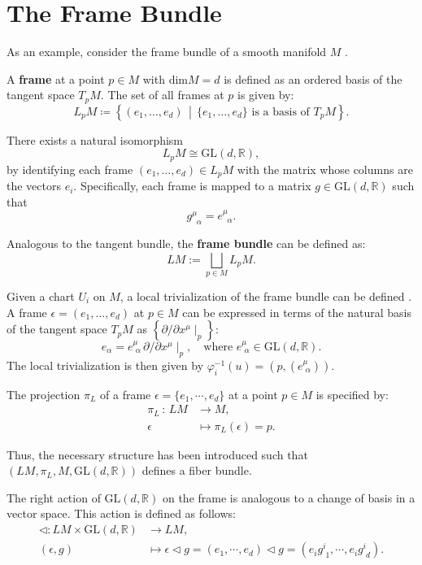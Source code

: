 \section{The Frame Bundle}

As an example, consider the frame bundle of a smooth manifold \( M \) \cite{NakaharaGeometrytopologyphysics2005}.

A \textbf{frame} at a point \( p \in M \) with \(\text{dim} M = d\) is defined as an ordered basis of the tangent space \(T_pM\). The set of all frames at \( p \) is given by:
\[
L_pM \coloneqq \left\{ (e_1, \dots, e_d) \,\middle|\, \{e_1, \dots, e_d\} \text{ is a basis of } T_pM \right\}.
\]

There exists a natural isomorphism
\[
L_pM \cong \mathrm{GL}(d, \mathbb{R}),
\]
by identifying each frame \( (e_1, \dots, e_d) \in L_pM \) with the matrix whose columns are the vectors \( e_i \). Specifically, each frame is mapped to a matrix \( g \in \mathrm{GL}(d, \mathbb{R}) \) such that
\[
g^\mu_{\;\;\alpha} = e^\mu_{\;\;\alpha}.
\]

Analogous to the tangent bundle, the \textbf{frame bundle} can be defined as:
\[ LM := \bigsqcup_{p \in M} L_pM. \]

Given a chart \( U_i \) on \( M \), a local trivialization of the frame bundle can be defined \cite{NakaharaGeometrytopologyphysics2005}. A frame \( \epsilon = (e_1, \dots, e_d) \) at \( p \in M \) can be expressed in terms of the natural basis of the tangent space \( T_pM \) as \( \left\{ \partial / \partial x^\mu \mid_p \right\} \):
\[ e_\alpha = e^\mu_{\,\,\alpha} \, \partial/\partial x^\mu \mid_p, \quad \text{where } e^\mu_{\,\,\alpha} \in \mathrm{GL}(d, \mathbb{R}). \]
The local trivialization is then given by \( \varphi_i^{-1}(u)=(p,(e^\mu_{\,\,\alpha})) \).

The projection \( \pi_L \) of a frame \( \epsilon = \{e_1, \cdots, e_d\} \) at a point \( p \in M \) is specified by:
\begin{align*}
  \pi_L \, : \, LM & \longrightarrow M, \\
        \epsilon & \mapsto \pi_L(\epsilon)=p.
\end{align*}

Thus, the necessary structure has been introduced such that \( (LM, \pi_L, M, \text{GL}(d,\mathbb{R})) \) defines a fiber bundle.

The right action of \( \mathrm{GL}(d,\mathbb{R}) \) on the frame is analogous to a change of basis in a vector space. This action is defined as follows:
\begin{align*}
  \triangleleft : LM \times \mathrm{GL}(d,\mathbb{R}) & \longrightarrow LM, \\
  (\epsilon, g) & \mapsto \epsilon \triangleleft g = (e_1, \cdots, e_d) \triangleleft g = (e_i g^i_{\,\,1}, \cdots, e_i g^i_{\,\,d}).
\end{align*}

